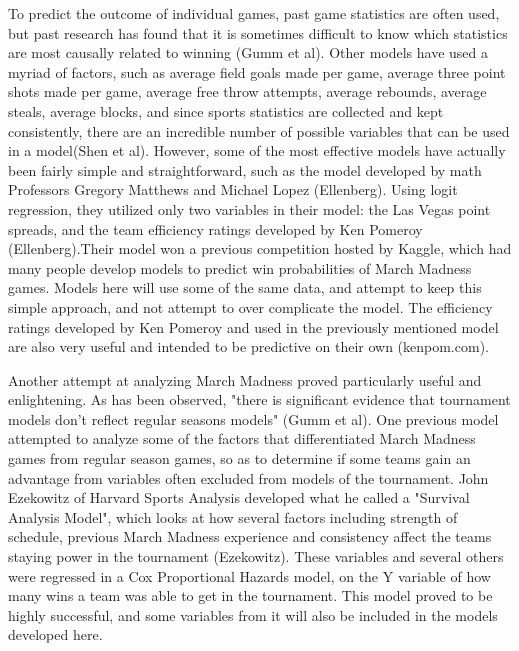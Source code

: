 \documentclass{article}
\begin{document}
To predict the outcome of individual games, past game statistics are often used, but past research has found that it is sometimes difficult to know which statistics are most causally related to winning (Gumm et al). Other models have used a myriad of factors, such as average field goals made per game, average three point shots made per game, average free throw attempts, average rebounds, average steals, average blocks, and since sports statistics are collected and kept consistently, there are an incredible number of possible variables that can be used in a model(Shen et al). However, some of the most effective models have actually been fairly simple and straightforward, such as the model developed by math Professors Gregory Matthews and Michael Lopez (Ellenberg). Using logit regression, they utilized only two variables in their model: the Las Vegas point spreads, and the team efficiency ratings developed by Ken Pomeroy (Ellenberg).Their model won a previous competition hosted by Kaggle, which had many people develop models to predict win probabilities of March Madness games. Models here will use some of the same data, and attempt to keep this simple approach, and not attempt to over complicate the model. The efficiency ratings developed by Ken Pomeroy and used in the previously mentioned model are also very useful and intended to be predictive on their own (kenpom.com). 

Another attempt at analyzing March Madness proved particularly useful and enlightening. As has been observed, "there is significant evidence that tournament models don't reflect regular seasons models" (Gumm et al). One previous model attempted to analyze some of the factors that differentiated March Madness games from regular season games, so as to determine if some teams gain an advantage from variables often excluded from models of the tournament. John Ezekowitz of Harvard Sports Analysis developed what he called a "Survival Analysis Model", which looks at how several factors including strength of schedule, previous March Madness experience and consistency affect the teams staying power in the tournament (Ezekowitz). These variables and several others were regressed in a Cox Proportional Hazards model, on the Y variable of how many wins a team was able to get in the tournament. This model proved to be highly successful, and some variables from it will also be included in the models developed here. 
\end{document}
